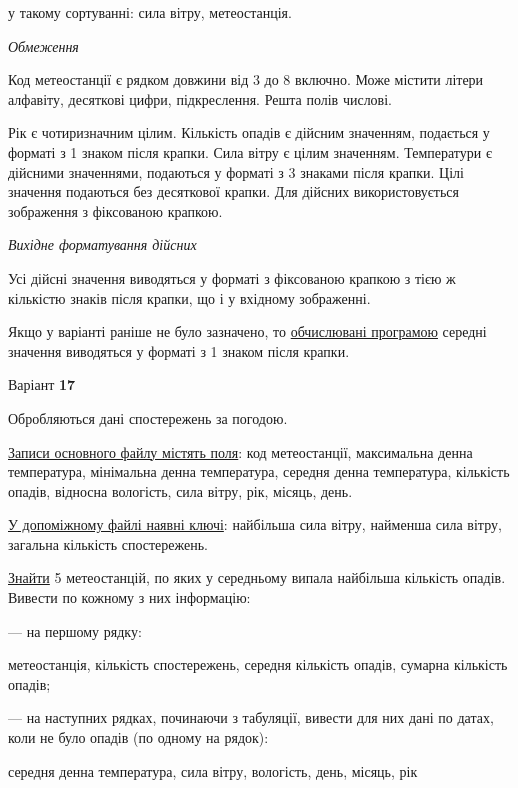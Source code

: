 \documentclass[11pt, ukrainian]{article}
\begin{document}
{\noindent}у такому сортуванні: сила вітру, метеостанція.


\bigskip\textit{Обмеження}

Код метеостанції є рядком довжини від 3 до 8 включно.
Може містити літери алфавіту, десяткові цифри, підкреслення. Решта полів числові.

Рік є чотиризначним цілим.
Кількість опадів є дійсним значенням, подається у форматі з 1 знаком після крапки.
Сила вітру є цілим значенням.
Температури є дійсними значеннями, подаються у форматі з 3 знаками після крапки.
Цілі значення подаються без десяткової крапки.
Для дійсних використовується зображення з фіксованою крапкою.

\textit{Вихідне форматування дійсних}

Усі дійсні значення виводяться у форматі з фіксованою крапкою з тією ж кількістю знаків після крапки, що і у вхідному зображенні.

Якщо у варіанті раніше не було зазначено, то \underline{обчислювані програмою} середні значення виводяться у форматі з 1 знаком після крапки.


\par
\newpage
{\center Варіант  \No \textbf { 17 }\par}
\bigskip
Обробляються дані спостережень за погодою. 

\underline{Записи основного файлу містять поля}: код метеостанції, максимальна денна температура, мініма\-ль\-на денна температура, середня денна температура, кількість опадів, відносна вологість, сила вітру, рік, місяць, день.

\underline{У допоміжному файлі наявні ключі}: найбільша сила вітру, найменша сила вітру, загальна кількість спостережень.

\underline{Знайти} 5 метеостанцій, по яких у середньому випала найбільша кількість опадів. Вивести по кожному з них інформацію:\par
{\noindent}--- на першому рядку:\par
метеостанція, кількість спостережень, середня кількість опадів, сумарна кількість опадів;

{\noindent}--- на наступних рядках, починаючи з табуляції, вивести для них дані по датах, коли не було опадів (по одному на рядок):\par
середня денна температура, сила вітру, вологість, день, місяць, рік
\end{document}
